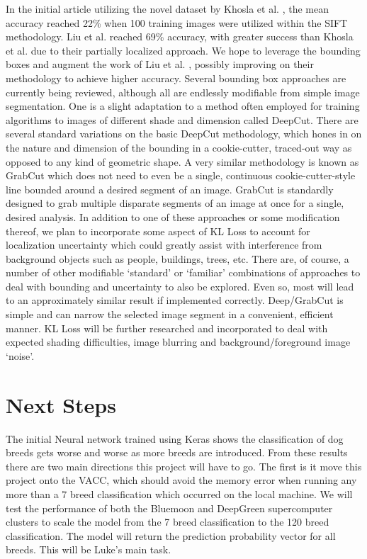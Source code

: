 \documentclass[12pt]{article}
\begin{document}
In the initial article utilizing the novel dataset by Khosla et al. \cite{khosla2011novel}, the mean accuracy reached 22\% when 100 training images were utilized within the SIFT methodology. Liu et al. \cite{liu2012dog} reached 69\% accuracy, with greater success than Khosla et al. \cite{khosla2011novel} due to their partially localized approach.  We hope to leverage the bounding boxes and augment the work of Liu et al. \cite{liu2012dog}, possibly improving on their methodology to achieve higher accuracy. Several bounding box approaches are currently being reviewed, although all are endlessly modifiable from simple image segmentation. One is a slight adaptation to a method often employed for training algorithms to images of different shade and dimension called DeepCut.  \cite{rajchl2016deepcut} There are several standard variations on the basic DeepCut methodology, which hones in on the nature and dimension of the bounding in a cookie-cutter, traced-out way as opposed to any kind of geometric shape. A very similar methodology is known as GrabCut which does not need to even be a single, continuous cookie-cutter-style line bounded around a desired segment of an image. GrabCut is standardly designed to grab multiple disparate segments of an image at once for a single, desired analysis. In addition to one of these approaches or some modification thereof, we plan to incorporate some aspect of KL Loss to account for localization uncertainty which could greatly assist with interference from background objects such as people, buildings, trees, etc. \cite{he2019bounding} There are, of course, a number of other modifiable ‘standard’ or ‘familiar’ combinations of approaches to deal with bounding and uncertainty to also be explored. Even so, most will lead to an approximately similar result if implemented correctly. Deep/GrabCut is simple and can narrow the selected image segment in a convenient, efficient manner. KL Loss will be further researched and incorporated to deal with expected shading difficulties, image blurring and background/foreground image ‘noise’.

\section{Next Steps}

The initial Neural network trained using Keras shows the classification of dog breeds gets worse and worse as more breeds are introduced. From these results there are two main directions this project will have to go.  The first is it move this project onto the VACC, which should avoid the memory error when running any more than a 7 breed classification which occurred on the local machine.  We will test the performance of both the Bluemoon and DeepGreen supercomputer clusters to scale the model from the 7 breed classification to the 120 breed classification.  The model will return the prediction probability vector for all breeds. This will be Luke's main task.
\end{document}
